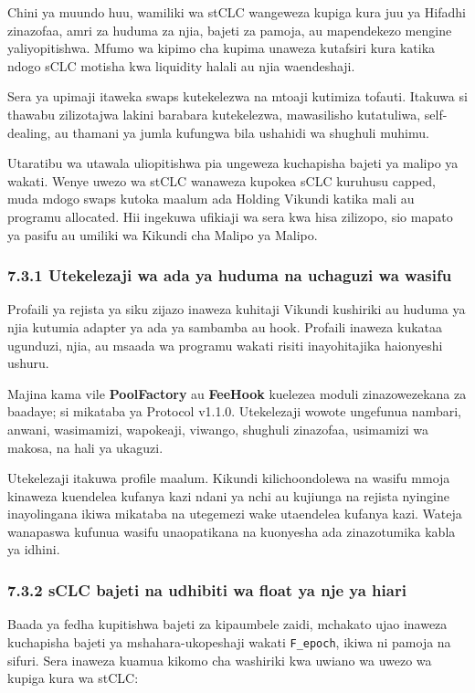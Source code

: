 \documentclass[11pt]{article}
\begin{document}
Chini ya muundo huu, wamiliki wa stCLC wangeweza kupiga kura juu ya Hifadhi zinazofaa, amri za huduma za njia, bajeti za pamoja, au mapendekezo mengine yaliyopitishwa. Mfumo wa kipimo cha kupima unaweza kutafsiri kura katika ndogo sCLC motisha kwa liquidity halali au njia waendeshaji.

Sera ya upimaji itaweka swaps kutekelezwa na mtoaji kutimiza tofauti. Itakuwa si thawabu zilizotajwa lakini barabara kutekelezwa, mawasilisho kutatuliwa, self-dealing, au thamani ya jumla kufungwa bila ushahidi wa shughuli muhimu.

Utaratibu wa utawala uliopitishwa pia ungeweza kuchapisha bajeti ya malipo ya wakati. Wenye uwezo wa stCLC wanaweza kupokea sCLC kuruhusu capped, muda mdogo swaps kutoka maalum ada Holding Vikundi katika mali au programu allocated. Hii ingekuwa ufikiaji wa sera kwa hisa zilizopo, sio mapato ya pasifu au umiliki wa Kikundi cha Malipo ya Malipo.

\subsubsection*{7.3.1 Utekelezaji wa ada ya huduma na uchaguzi wa wasifu}

Profaili ya rejista ya siku zijazo inaweza kuhitaji Vikundi kushiriki au huduma ya njia kutumia adapter ya ada ya sambamba au hook. Profaili inaweza kukataa ugunduzi, njia, au msaada wa programu wakati risiti inayohitajika haionyeshi ushuru.

Majina kama vile \textbf{PoolFactory } au \textbf{ FeeHook} kuelezea moduli zinazowezekana za baadaye; si mikataba ya Protocol v1.1.0. Utekelezaji wowote ungefunua nambari, anwani, wasimamizi, wapokeaji, viwango, shughuli zinazofaa, usimamizi wa makosa, na hali ya ukaguzi.

Utekelezaji itakuwa profile maalum. Kikundi kilichoondolewa na wasifu mmoja kinaweza kuendelea kufanya kazi ndani ya nchi au kujiunga na rejista nyingine inayolingana ikiwa mikataba na utegemezi wake utaendelea kufanya kazi. Wateja wanapaswa kufunua wasifu unaopatikana na kuonyesha ada zinazotumika kabla ya idhini.

\subsubsection*{7.3.2 sCLC bajeti na udhibiti wa float ya nje ya hiari}

Baada ya fedha kupitishwa bajeti za kipaumbele zaidi, mchakato ujao inaweza kuchapisha bajeti ya mshahara-ukopeshaji wakati \texttt{F\_epoch}, ikiwa ni pamoja na sifuri. Sera inaweza kuamua kikomo cha washiriki kwa uwiano wa uwezo wa kupiga kura wa stCLC:
\end{document}
